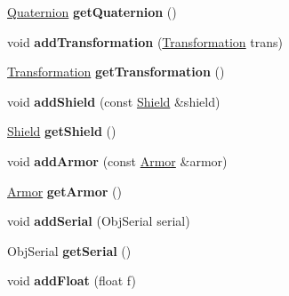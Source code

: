 \begin{DoxyCompactItemize}
\item 
\hyperlink{structQuaternion}{Quaternion} {\bfseries get\+Quaternion} ()\hypertarget{classNetBuffer_a56fc22a596c7f50069ed0a2443e54d02}{}\label{classNetBuffer_a56fc22a596c7f50069ed0a2443e54d02}

\item 
void {\bfseries add\+Transformation} (\hyperlink{structTransformation}{Transformation} trans)\hypertarget{classNetBuffer_aab18d5f304c7c90e5f61c352279dfa68}{}\label{classNetBuffer_aab18d5f304c7c90e5f61c352279dfa68}

\item 
\hyperlink{structTransformation}{Transformation} {\bfseries get\+Transformation} ()\hypertarget{classNetBuffer_a09ba1b57cc91baa897a0eab1081c032e}{}\label{classNetBuffer_a09ba1b57cc91baa897a0eab1081c032e}

\item 
void {\bfseries add\+Shield} (const \hyperlink{structShield}{Shield} \&shield)\hypertarget{classNetBuffer_a4195f299415e2096fd0f9a4b04e77ffa}{}\label{classNetBuffer_a4195f299415e2096fd0f9a4b04e77ffa}

\item 
\hyperlink{structShield}{Shield} {\bfseries get\+Shield} ()\hypertarget{classNetBuffer_a7ea511048bfe1d55e04888db0617859f}{}\label{classNetBuffer_a7ea511048bfe1d55e04888db0617859f}

\item 
void {\bfseries add\+Armor} (const \hyperlink{structArmor}{Armor} \&armor)\hypertarget{classNetBuffer_a0d5dc17c560885619e4e4ab2cafbd5ea}{}\label{classNetBuffer_a0d5dc17c560885619e4e4ab2cafbd5ea}

\item 
\hyperlink{structArmor}{Armor} {\bfseries get\+Armor} ()\hypertarget{classNetBuffer_a24ac522013904bfb72e084b2bff69e35}{}\label{classNetBuffer_a24ac522013904bfb72e084b2bff69e35}

\item 
void {\bfseries add\+Serial} (Obj\+Serial serial)\hypertarget{classNetBuffer_ab568f922de1392b01a3db48ef2236451}{}\label{classNetBuffer_ab568f922de1392b01a3db48ef2236451}

\item 
Obj\+Serial {\bfseries get\+Serial} ()\hypertarget{classNetBuffer_a8721d2a6277f820dcc31500842c8e623}{}\label{classNetBuffer_a8721d2a6277f820dcc31500842c8e623}

\item 
void {\bfseries add\+Float} (float f)\hypertarget{classNetBuffer_afeac92c272b7b08fff4ecae72b5f35a0}{}\label{classNetBuffer_afeac92c272b7b08fff4ecae72b5f35a0}


\end{DoxyCompactItemize}
